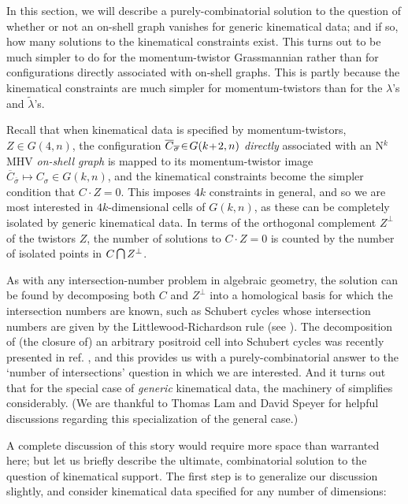 \documentclass[12pt,hyperref,compress]{JHEP3}
\renewcommand{\bar}{\overline}
\newcommand{\newcap}{{\small\mathrm{\raisebox{0.95pt}{{$\,\bigcap\,$}}}}}
\newcommand{\pl}{\hspace{0.5pt}\text{{\small+}}\hspace{-0.5pt}}
\begin{document}
{In this section, we will describe a purely-combinatorial solution to the question of whether or not an on-shell graph vanishes for generic kinematical data; and if so, how many solutions to the kinematical constraints exist. This turns out to be much simpler to do for the momentum-twistor Grassmannian rather than for configurations directly associated with on-shell graphs. This is partly because the kinematical constraints are much simpler for momentum-twistors than for the $\lambda$'s and $\widetilde\lambda$'s.

Recall that when kinematical data is specified by momentum-twistors, \mbox{$Z\!\in\!G(4,n)$}, the configuration $\bar{C}_{\bar{\sigma}}\!\in\!G(k\pl\,2,n)$ {\it directly} associated with an N$^k$MHV {\it on-shell graph} is mapped to its momentum-twistor image $\bar{C}_{\bar{\sigma}}\mapsto C_{\sigma}\!\in\!G(k,n)$, and the kinematical constraints become the simpler condition that $C\!\cdot\!Z=0$. This imposes $4k$ constraints in general, and so we are most interested in $4k$-dimensional cells of $G(k,n)$, as these can be completely isolated by generic kinematical data. In terms of the orthogonal complement $Z^\perp$ of the twistors $Z$, the number of solutions to $C\!\cdot\!Z=0$ is counted by the number of isolated points in $C\newcap Z^\perp$.


As with any intersection-number problem in algebraic geometry, the solution can be found by decomposing both $C$ and $Z^{\perp}$ into a homological basis for which the intersection numbers are known, such as Schubert cycles whose intersection numbers are given by the Littlewood-Richardson rule (see \cite{GriffithsHarris}). The decomposition of (the closure of) an arbitrary positroid cell into Schubert cycles was recently presented in ref. \cite{KLS}, and this provides us with a purely-combinatorial answer to the `number of intersections' question in which we are interested. And it turns out that for the special case of {\it generic} kinematical data, the machinery of \cite{KLS} simplifies considerably. (We are thankful to Thomas Lam and David Speyer for helpful discussions regarding this specialization of the general case.)

A complete discussion of this story would require more space than warranted here; but let us briefly describe the ultimate, combinatorial solution to the question of kinematical support. The first step is to generalize our discussion slightly, and consider kinematical data specified for any number of dimensions:\\[-7pt]

}
\end{document}
